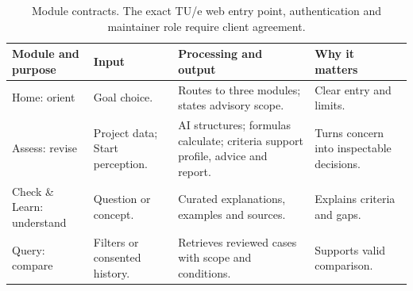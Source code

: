 \documentclass[11pt,a4paper]{article}
\begin{document}
\begin{table}[H]
\centering\small
\begin{tabularx}{\textwidth}{@{}>{\raggedright\arraybackslash}p{}>{\raggedright\arraybackslash}p{}>{\raggedright\arraybackslash}p{}>{\raggedright\arraybackslash}X@{}}
\toprule
Module and purpose & Input & Processing and output & Why it matters \\
\midrule
Home: orient & Goal choice. & Routes to three modules; states advisory scope. & Clear entry and limits. \\
Assess: revise & Project data; Start perception. & AI structures; formulas calculate; criteria support profile, advice and report. & Turns concern into inspectable decisions. \\
Check \& Learn: understand & Question or concept. & Curated explanations, examples and sources. & Explains criteria and gaps. \\
Query: compare & Filters or consented history. & Retrieves reviewed cases with scope and conditions. & Supports valid comparison. \\
\bottomrule
\end{tabularx}
\caption{Module contracts. The exact TU/e web entry point, authentication and maintainer role require client agreement.}
\label{tab:phase2-modules}
\end{table}
\end{document}
